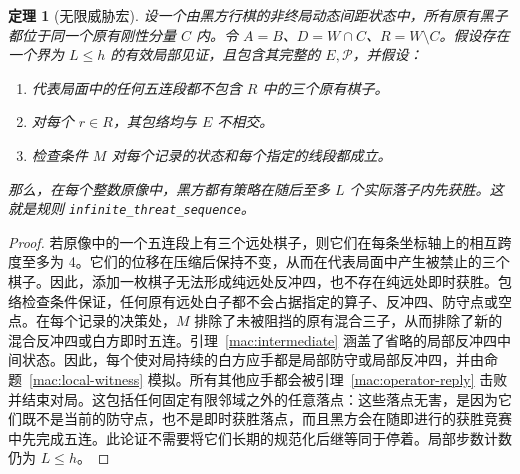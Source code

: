 \documentclass[11pt]{article}
\newtheorem{theorem}{定理}[section]
\theoremstyle{definition}
\theoremstyle{remark}
\begin{document}
\begin{theorem}[无限威胁宏]\label{mac:infinite}
设一个由黑方行棋的非终局动态间距状态中，所有原有黑子都位于同一个原有刚性分量 \(C\) 内。令 \(A=B\)、\(D=W\cap C\)、\(R=W\setminus C\)。假设存在一个界为 \(L\le h\) 的有效局部见证，且包含其完整的 \(E,\mathcal P\)，并假设：

\begin{enumerate}
\item 代表局面中的任何五连段都不包含 \(R\) 中的三个原有棋子。
\item 对每个 \(r\in R\)，其包络均与 \(E\) 不相交。
\item 检查条件 \(M\) 对每个记录的状态和每个指定的线段都成立。

\end{enumerate}
那么，在每个整数原像中，黑方都有策略在随后至多 \(L\) 个实际落子内先获胜。这就是规则 \texttt{infinite\_threat\_sequence}。

\end{theorem}
\begin{proof}
若原像中的一个五连段上有三个远处棋子，则它们在每条坐标轴上的相互跨度至多为 4。它们的位移在压缩后保持不变，从而在代表局面中产生被禁止的三个棋子。因此，添加一枚棋子无法形成纯远处反冲四，也不存在纯远处即时获胜。包络检查条件保证，任何原有远处白子都不会占据指定的算子、反冲四、防守点或空点。在每个记录的决策处，\(M\) 排除了未被阻挡的原有混合三子，从而排除了新的混合反冲四或白方即时五连。引理~\ref{mac:intermediate} 涵盖了省略的局部反冲四中间状态。因此，每个使对局持续的白方应手都是局部防守或局部反冲四，并由命题~\ref{mac:local-witness} 模拟。所有其他应手都会被引理~\ref{mac:operator-reply} 击败并结束对局。这包括任何固定有限邻域之外的任意落点：这些落点无害，是因为它们既不是当前的防守点，也不是即时获胜落点，而且黑方会在随即进行的获胜竞赛中先完成五连。此论证不需要将它们长期的规范化后继等同于停着。局部步数计数仍为 \(L\le h\)。
\end{proof}
\end{document}
